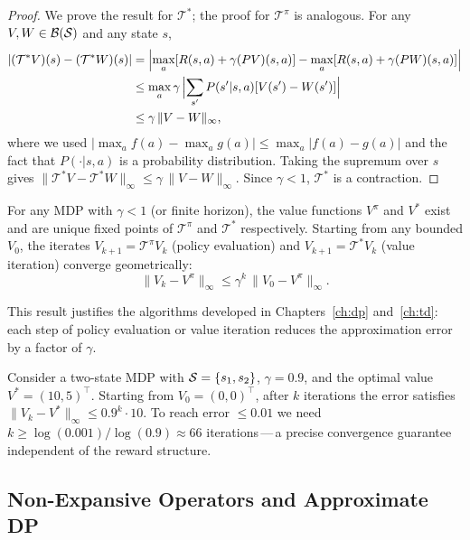 \begin{proof}
We prove the result for $\mathcal{T}^*$; the proof for $\mathcal{T}^\pi$
is analogous.  For any $V, W \in \mathcal{B}(\mathcal{S})$ and any state $s$,
\begin{align*}
|(\mathcal{T}^* V)(s) - (\mathcal{T}^* W)(s)|
&= \Bigl|\max_a [R(s,a) + \gamma(PV)(s,a)]
   - \max_a [R(s,a) + \gamma(PW)(s,a)]\Bigr| \\
&\leq \max_a \gamma\,\Bigl|\sum_{s'} P(s'|s,a)[V(s')-W(s')]\Bigr| \\
&\leq \gamma\,\|V - W\|_\infty,
\end{align*}
where we used $|\max_a f(a) - \max_a g(a)| \leq \max_a |f(a)-g(a)|$
and the fact that $P(\cdot|s,a)$ is a probability distribution.  Taking
the supremum over $s$ gives
$\|\mathcal{T}^* V - \mathcal{T}^* W\|_\infty \leq \gamma\,\|V-W\|_\infty$.
Since $\gamma < 1$, $\mathcal{T}^*$ is a contraction.
\end{proof}

\begin{corollary}
\label{cor:value-exists}
For any MDP with $\gamma < 1$ (or finite horizon), the value functions
$V^\pi$ and $V^*$ exist and are unique fixed points of $\mathcal{T}^\pi$
and $\mathcal{T}^*$ respectively.  Starting from any bounded $V_0$,
the iterates $V_{k+1} = \mathcal{T}^\pi V_k$ (policy evaluation) and
$V_{k+1} = \mathcal{T}^* V_k$ (value iteration) converge geometrically:
\[
    \|V_k - V^\pi\|_\infty \leq \gamma^k\,\|V_0 - V^\pi\|_\infty.
\]
\end{corollary}

This result justifies the algorithms developed in Chapters~\ref{ch:dp}
and~\ref{ch:td}: each step of policy evaluation or value iteration reduces
the approximation error by a factor of $\gamma$.

\begin{example}
Consider a two-state MDP with $\mathcal{S} = \{s_1, s_2\}$, $\gamma = 0.9$, and
the optimal value $V^* = (10, 5)^\top$.  Starting from $V_0 = (0,0)^\top$,
after $k$ iterations the error satisfies
$\|V_k - V^*\|_\infty \leq 0.9^k \cdot 10$.  To reach error $\leq 0.01$
we need $k \geq \log(0.001)/\log(0.9) \approx 66$ iterations\,---\,a
precise convergence guarantee independent of the reward structure.
\end{example}

\subsection*{Non-Expansive Operators and Approximate DP}

